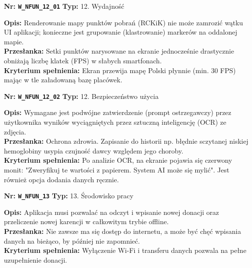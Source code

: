 \documentclass[11pt, a4paper]{article}
\newcommand{\req}[1]{\texttt{#1}}
\begin{document}
\begin{mdframed}[style=reqheader]
  \textbf{Nr: \req{W\_NFUN\_12\_01}} \hfill \textbf{Typ:} 12. Wydajność
\end{mdframed}
\begin{mdframed}[style=reqcard]
  \textbf{Opis:} Renderowanie mapy punktów pobrań (RCKiK) nie może zamrozić wątku UI aplikacji; konieczne jest grupowanie (klastrowanie) markerów na oddalonej mapie. \\
  \textbf{Przesłanka:} Setki punktów narysowane na ekranie jednocześnie drastycznie obniżają liczbę klatek (FPS) w słabych smartfonach. \\
  \textbf{Kryterium spełnienia:} Ekran przewija mapę Polski płynnie (min. 30 FPS) mając w tle załadowaną bazę placówek.
\end{mdframed}

\begin{mdframed}[style=reqheader]
  \textbf{Nr: \req{W\_NFUN\_12\_02}} \hfill \textbf{Typ:} 12. Bezpieczeństwo użycia
\end{mdframed}
\begin{mdframed}[style=reqcard]
  \textbf{Opis:} Wymagane jest podwójne zatwierdzenie (prompt ostrzegawczy) przez użytkownika wyników wyciągniętych przez sztuczną inteligencję (OCR) ze zdjęcia. \\
  \textbf{Przesłanka:} Ochrona zdrowia. Zapisanie do historii np. błędnie sczytanej niskiej hemoglobiny usypia czujność dawcy względem jego choroby. \\
  \textbf{Kryterium spełnienia:} Po analizie OCR, na ekranie pojawia się czerwony monit: "Zweryfikuj te wartości z papierem. System AI może się mylić". Jest również opcja dodania danych ręcznie.
\end{mdframed}

\begin{mdframed}[style=reqheader]
  \textbf{Nr: \req{W\_NFUN\_13}} \hfill \textbf{Typ:} 13. Środowisko pracy
\end{mdframed}
\begin{mdframed}[style=reqcard]
  \textbf{Opis:} Aplikacja musi pozwalać na odczyt i wpisanie nowej donacji oraz przeliczenie nowej karencji w całkowitym trybie offline. \\
  \textbf{Przesłanka:} Nie zawsze ma się dostęp do internetu, a może być chęć wpisania danych na bieżąco, by później nie zapomnieć. \\
  \textbf{Kryterium spełnienia:} Wyłączenie Wi-Fi i transferu danych pozwala na pełne uzupełnienie donacji.
\end{mdframed}
\end{document}
